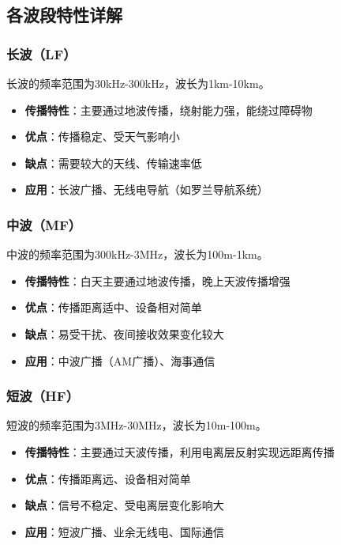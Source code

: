 \subsection{各波段特性详解}
\label{sec:band_characteristics}

\subsubsection{长波（LF）}
\label{sec:long_wave}

长波的频率范围为30kHz-300kHz，波长为1km-10km。

\begin{itemize}
    \item \textbf{传播特性}：主要通过地波传播，绕射能力强，能绕过障碍物
    \item \textbf{优点}：传播稳定、受天气影响小
    \item \textbf{缺点}：需要较大的天线、传输速率低
    \item \textbf{应用}：长波广播、无线电导航（如罗兰导航系统）
\end{itemize}

\subsubsection{中波（MF）}
\label{sec:medium_wave}

中波的频率范围为300kHz-3MHz，波长为100m-1km。

\begin{itemize}
    \item \textbf{传播特性}：白天主要通过地波传播，晚上天波传播增强
    \item \textbf{优点}：传播距离适中、设备相对简单
    \item \textbf{缺点}：易受干扰、夜间接收效果变化较大
    \item \textbf{应用}：中波广播（AM广播）、海事通信
\end{itemize}

\subsubsection{短波（HF）}
\label{sec:short_wave}

短波的频率范围为3MHz-30MHz，波长为10m-100m。

\begin{itemize}
    \item \textbf{传播特性}：主要通过天波传播，利用电离层反射实现远距离传播
    \item \textbf{优点}：传播距离远、设备相对简单
    \item \textbf{缺点}：信号不稳定、受电离层变化影响大
    \item \textbf{应用}：短波广播、业余无线电、国际通信
\end{itemize}

